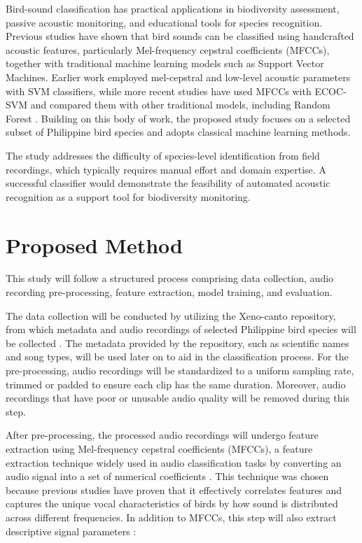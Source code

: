 \documentclass[runningheads]{llncs}
\begin{document}
Bird-sound classification has practical applications in biodiversity assessment, passive acoustic monitoring, and educational tools for species recognition. Previous studies have shown that bird sounds can be classified using handcrafted acoustic features, particularly Mel-frequency cepstral coefficients (MFCCs), together with traditional machine learning models such as Support Vector Machines. Earlier work employed mel-cepstral and low-level acoustic parameters with SVM classifiers, while more recent studies have used MFCCs with ECOC-SVM and compared them with other traditional models, including Random Forest \cite{fagerlund2007,han2023}. Building on this body of work, the proposed study focuses on a selected subset of Philippine bird species and adopts classical machine learning methods.

The study addresses the difficulty of species-level identification from field recordings, which typically requires manual effort and domain expertise. A successful classifier would demonstrate the feasibility of automated acoustic recognition as a support tool for biodiversity monitoring.
\section{Proposed Method}

This study will follow a structured process comprising data collection, audio recording pre-processing, feature extraction, model training, and evaluation.

The data collection will be conducted by utilizing the Xeno-canto repository, from which metadata and audio recordings of selected Philippine bird species will be collected \cite{xenocanto}. The metadata provided by the repository, such as scientific names and song types, will be used later on to aid in the classification process. For the pre-processing, audio recordings will be standardized to a uniform sampling rate, trimmed or padded to ensure each clip has the same duration. Moreover, audio recordings that have poor or unusable audio quality will be removed during this step. 

After pre-processing, the processed audio recordings will undergo feature extraction using Mel-frequency cepstral coefficients (MFCCs), a feature extraction technique widely used in audio classification tasks by converting an audio signal into a set of numerical coefficients \cite{librosa_mfcc,fagerlund2007}. This technique was chosen because previous studies have proven that it effectively correlates features and captures the unique vocal characteristics of birds by how sound is distributed across different frequencies. In addition to MFCCs, this step will also extract descriptive signal parameters \cite{fagerlund2007}:
\end{document}
